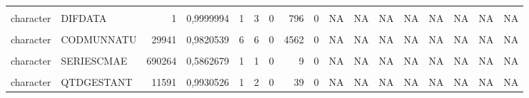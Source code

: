 \begin{table}[!h]
\begin{tabular}[t]{llrrrrrrrrrrrrrrl}
\cellcolor{gray!10}{character} & \cellcolor{gray!10}{NUMEROLOTE} & \cellcolor{gray!10}{1} & \cellcolor{gray!10}{0,9999994} & \cellcolor{gray!10}{8} & \cellcolor{gray!10}{8} & \cellcolor{gray!10}{0} & \cellcolor{gray!10}{1885} & \cellcolor{gray!10}{0} & \cellcolor{gray!10}{NA} & \cellcolor{gray!10}{NA} & \cellcolor{gray!10}{NA} & \cellcolor{gray!10}{NA} & \cellcolor{gray!10}{NA} & \cellcolor{gray!10}{NA} & \cellcolor{gray!10}{NA} & \cellcolor{gray!10}{NA}\\
character & DIFDATA & 1 & 0,9999994 & 1 & 3 & 0 & 796 & 0 & NA & NA & NA & NA & NA & NA & NA & NA\\
\cellcolor{gray!10}{character} & \cellcolor{gray!10}{NATURALMAE} & \cellcolor{gray!10}{29939} & \cellcolor{gray!10}{0,9820551} & \cellcolor{gray!10}{3} & \cellcolor{gray!10}{3} & \cellcolor{gray!10}{0} & \cellcolor{gray!10}{29} & \cellcolor{gray!10}{0} & \cellcolor{gray!10}{NA} & \cellcolor{gray!10}{NA} & \cellcolor{gray!10}{NA} & \cellcolor{gray!10}{NA} & \cellcolor{gray!10}{NA} & \cellcolor{gray!10}{NA} & \cellcolor{gray!10}{NA} & \cellcolor{gray!10}{NA}\\
character & CODMUNNATU & 29941 & 0,9820539 & 6 & 6 & 0 & 4562 & 0 & NA & NA & NA & NA & NA & NA & NA & NA\\
\addlinespace
\cellcolor{gray!10}{character} & \cellcolor{gray!10}{ESCMAE2010} & \cellcolor{gray!10}{8273} & \cellcolor{gray!10}{0,9950413} & \cellcolor{gray!10}{1} & \cellcolor{gray!10}{1} & \cellcolor{gray!10}{0} & \cellcolor{gray!10}{7} & \cellcolor{gray!10}{0} & \cellcolor{gray!10}{NA} & \cellcolor{gray!10}{NA} & \cellcolor{gray!10}{NA} & \cellcolor{gray!10}{NA} & \cellcolor{gray!10}{NA} & \cellcolor{gray!10}{NA} & \cellcolor{gray!10}{NA} & \cellcolor{gray!10}{NA}\\
character & SERIESCMAE & 690264 & 0,5862679 & 1 & 1 & 0 & 9 & 0 & NA & NA & NA & NA & NA & NA & NA & NA\\
\cellcolor{gray!10}{character} & \cellcolor{gray!10}{DTNASCMAE} & \cellcolor{gray!10}{7813} & \cellcolor{gray!10}{0,9953170} & \cellcolor{gray!10}{10} & \cellcolor{gray!10}{10} & \cellcolor{gray!10}{0} & \cellcolor{gray!10}{14739} & \cellcolor{gray!10}{0} & \cellcolor{gray!10}{NA} & \cellcolor{gray!10}{NA} & \cellcolor{gray!10}{NA} & \cellcolor{gray!10}{NA} & \cellcolor{gray!10}{NA} & \cellcolor{gray!10}{NA} & \cellcolor{gray!10}{NA} & \cellcolor{gray!10}{NA}\\
character & QTDGESTANT & 11591 & 0,9930526 & 1 & 2 & 0 & 39 & 0 & NA & NA & NA & NA & NA & NA & NA & NA\\

\end{tabular}
\end{table}
